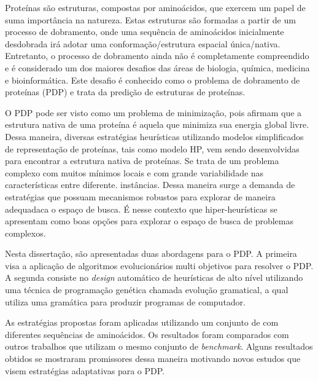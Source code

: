 \begin{resumo}


Proteínas são estruturas, compostas por aminoácidos, que exercem um papel de suma importância na natureza. Estas estruturas são formadas a partir de um processo de dobramento, onde uma sequência de aminoácidos inicialmente desdobrada irá adotar uma conformação/estrutura espacial única/nativa. Entretanto, o processo de dobramento ainda não é completamente compreendido e é considerado um dos maiores desafios das áreas de biologia, química, medicina e bioinformática. Este desafio é conhecido como o problema de dobramento de proteínas (PDP) e trata da predição de estruturas de proteínas. 

O PDP pode ser visto como um problema de minimização, pois afirmam que a estrutura nativa de uma proteína é aquela que minimiza sua energia global livre. Dessa maneira, diversas estratégias heurísticas utilizando modelos simplificados de representação de proteínas, tais como modelo HP, vem sendo desenvolvidas para encontrar a estrutura nativa de proteínas. 
 Se trata de um problema complexo com muitos mínimos locais e com grande variabilidade nas características entre diferente. instâncias. Dessa maneira surge a demanda de estratégias que possuam mecanismos robustos para explorar de maneira adequadaca o espaço de busca. É nesse contexto que hiper-heurísticas se apresentam como boas opções para explorar o espaço de busca de problemas complexos. 



Nesta dissertação, são apresentadas duas abordagens para o PDP. A primeira visa a aplicação de algoritmos evolucionários multi objetivos para resolver o PDP. A segunda consiste no \textit{design} automático de heurísticas de alto nível utilizando uma técnica de programação genética chamada evolução gramatical, a qual utiliza uma gramática para produzir programas de computador. 

 As estratégias propostas foram aplicadas utilizando um conjunto de  com diferentes sequências de aminoácidos. Os resultados foram comparados com outros trabalhos que utilizam o mesmo conjunto de \textit{benchmark}. Alguns resultados obtidos se mostraram promissores dessa maneira motivando novos estudos que visem estratégias adaptativas para o PDP.



\end{resumo}

